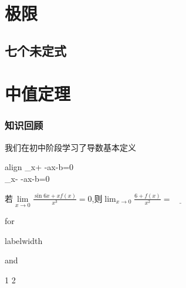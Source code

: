 \documentclass[no-math]{course}
\begin{document}
	\raggedbottom
	\abovedisplayshortskip=5pt
	\belowdisplayshortskip=5pt
	\abovedisplayskip=5pt
	\belowdisplayskip=5pt
	\frontmatter
		\tableofcontents
	\mainmatter
	\chapter{极限}
	\section{七个未定式}
	\chapter{中值定理}
	\begin{paracol}{2}

	\switchcolumn
		\subsection{知识回顾}
			我们在初中阶段学习了导数基本定义
		\begin{empheq}
		[box=\eqmybox]{align}
			\lim_{x\to+\infty} -ax-b=0 \\
			\lim_{x\to-\infty} -ax-b=0
		\end{empheq}


\end{paracol}
		\begin{examples}
若$\lim\limits_{x\to0}{\frac{\sin{6x}+xf(x)}{x^3}}=0$,则$\lim_{x\to0}{\frac{6+f(x)}{x^2}}=\underline{\qquad}$
	\end{examples}
\begin{Exercise}
	\begin{exercises}
		\item for
		\item labelwidth
		\item and
		\item {} {1} {2}
	\end{exercises}
\end{Exercise}
\end{document}
